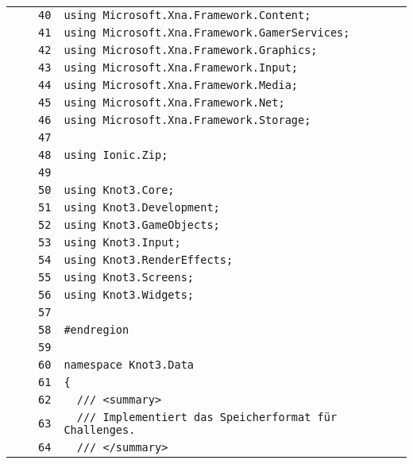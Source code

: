 \documentclass[a4paper,10pt]{article}
\begin{document}
\begin{longtable}[l]{lrrl}
\cellcolor{gray} &  & \verb~40~ & \verb~using Microsoft.Xna.Framework.Content;~\\
\cellcolor{gray} &  & \verb~41~ & \verb~using Microsoft.Xna.Framework.GamerServices;~\\
\cellcolor{gray} &  & \verb~42~ & \verb~using Microsoft.Xna.Framework.Graphics;~\\
\cellcolor{gray} &  & \verb~43~ & \verb~using Microsoft.Xna.Framework.Input;~\\
\cellcolor{gray} &  & \verb~44~ & \verb~using Microsoft.Xna.Framework.Media;~\\
\cellcolor{gray} &  & \verb~45~ & \verb~using Microsoft.Xna.Framework.Net;~\\
\cellcolor{gray} &  & \verb~46~ & \verb~using Microsoft.Xna.Framework.Storage;~\\
\cellcolor{gray} &  & \verb~47~ & \verb~~\\
\cellcolor{gray} &  & \verb~48~ & \verb~using Ionic.Zip;~\\
\cellcolor{gray} &  & \verb~49~ & \verb~~\\
\cellcolor{gray} &  & \verb~50~ & \verb~using Knot3.Core;~\\
\cellcolor{gray} &  & \verb~51~ & \verb~using Knot3.Development;~\\
\cellcolor{gray} &  & \verb~52~ & \verb~using Knot3.GameObjects;~\\
\cellcolor{gray} &  & \verb~53~ & \verb~using Knot3.Input;~\\
\cellcolor{gray} &  & \verb~54~ & \verb~using Knot3.RenderEffects;~\\
\cellcolor{gray} &  & \verb~55~ & \verb~using Knot3.Screens;~\\
\cellcolor{gray} &  & \verb~56~ & \verb~using Knot3.Widgets;~\\
\cellcolor{gray} &  & \verb~57~ & \verb~~\\
\cellcolor{gray} &  & \verb~58~ & \verb~#endregion~\\
\cellcolor{gray} &  & \verb~59~ & \verb~~\\
\cellcolor{gray} &  & \verb~60~ & \verb~namespace Knot3.Data~\\
\cellcolor{gray} &  & \verb~61~ & \verb~{~\\
\cellcolor{gray} &  & \verb~62~ & \verb~  /// <summary>~\\
\cellcolor{gray} &  & \verb~63~ & \verb~  /// Implementiert das Speicherformat für Challenges.~\\
\cellcolor{gray} &  & \verb~64~ & \verb~  /// </summary>~\\

\end{longtable}
\end{document}
